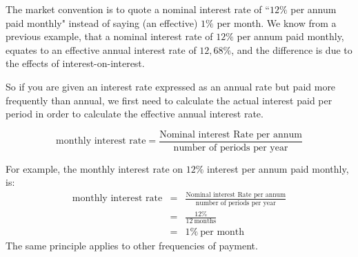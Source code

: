 The market convention is to quote a nominal interest rate of ``$12\%$ per annum paid monthly" instead of saying (an effective) $1\%$ per month. We know from a previous example, that a nominal interest rate of $12\%$ per annum paid monthly, equates to an effective annual interest rate of $12,68\%$, and the difference is due to the effects of interest-on-interest.

So if you are given an interest rate expressed as an annual rate but paid more frequently than annual, we first need to calculate the actual interest paid per period in order to calculate the effective annual interest rate.

\begin{equation}
\mbox{monthly interest rate}=\frac{\mbox{Nominal interest Rate per annum}}{\mbox{number of periods per year}}
\end{equation}

For example, the monthly interest rate on $12\%$ interest per annum paid monthly, is:
\begin{eqnarray*}
\mbox{monthly interest rate}&=&\frac{\mbox{Nominal interest Rate per annum}}{\mbox{number of periods per year}}\\
&=& \frac{12\%}{12~\mbox{months}}\\
&=& 1\%~\mbox{per month}
\end{eqnarray*}
The same principle applies to other frequencies of payment.

